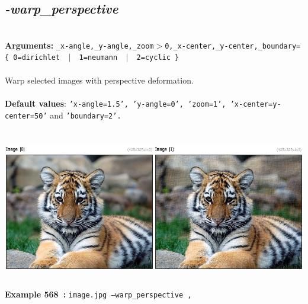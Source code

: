 \documentclass[a4paper,11pt,twoside]{book}
\begin{document}
\subsection{\emph{-warp\_perspective} }\vspace*{-0.5em}
~\\\textbf{Arguments: } 
{\small \texttt{\_x-angle,\_y-angle,\_zoom$>$0,\_x-center,\_y-center,\_boundary=\{ 0=dirichlet ~$|$~ 1=neumann ~$|$~ 2=cyclic \}}}\\~\\
Warp selected images with perspective deformation.
~\\~\\\textbf{Default values}: {\small \texttt{'x-angle=1.5', 'y-angle=0', 'zoom=1', 'x-center=y-center=50'} and \texttt{'boundary=2'.}}
\begin{center}\includegraphics[keepaspectratio=true,height=7cm,width=\textwidth]{img/gmic_def568.jpg}\\
{\footnotesize \textbf{Example 568~:} \texttt{image.jpg --warp\_perspective ,}}
\end{center}
\end{document}

